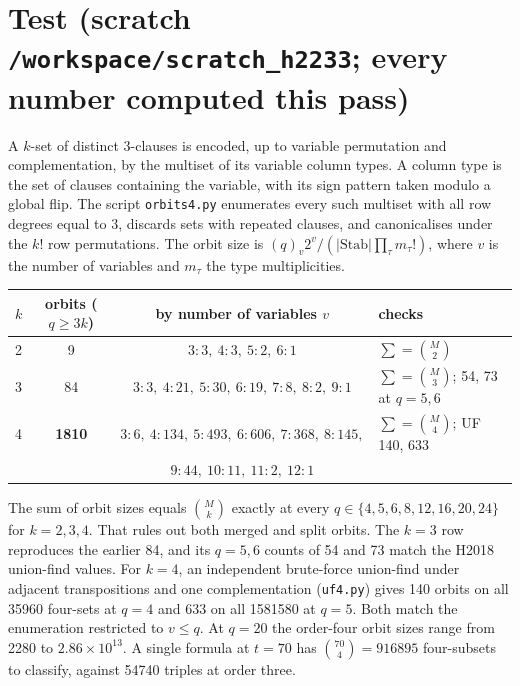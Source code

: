\documentclass[11pt]{article}
\begin{document}
\section*{Test (scratch \texttt{/workspace/scratch\_h2233}; every number computed this pass)}
A $k$-set of distinct 3-clauses is encoded, up to variable permutation and complementation, by the multiset of its variable column types. A column type is the set of clauses containing the variable, with its sign pattern taken modulo a global flip. The script \texttt{orbits4.py} enumerates every such multiset with all row degrees equal to 3, discards sets with repeated clauses, and canonicalises under the $k!$ row permutations. The orbit size is $(q)_v2^v/(|\mathrm{Stab}|\prod_\tau m_\tau!)$, where $v$ is the number of variables and $m_\tau$ the type multiplicities.

\begin{center}\begin{tabular}{lccl}\toprule
$k$ & orbits ($q\ge3k$) & by number of variables $v$ & checks\\\midrule
2 & 9 & $3{:}3,\ 4{:}3,\ 5{:}2,\ 6{:}1$ & $\sum=\binom M2$\\
3 & 84 & $3{:}3,\ 4{:}21,\ 5{:}30,\ 6{:}19,\ 7{:}8,\ 8{:}2,\ 9{:}1$ & $\sum=\binom M3$; 54, 73 at $q=5,6$\\
4 & \textbf{1810} & $3{:}6,\ 4{:}134,\ 5{:}493,\ 6{:}606,\ 7{:}368,\ 8{:}145,$ & $\sum=\binom M4$; UF 140, 633\\
 & & $9{:}44,\ 10{:}11,\ 11{:}2,\ 12{:}1$ & \\\bottomrule
\end{tabular}\end{center}

The sum of orbit sizes equals $\binom{M}{k}$ exactly at every $q\in\{4,5,6,8,12,16,20,24\}$ for $k=2,3,4$. That rules out both merged and split orbits. The $k=3$ row reproduces the earlier 84, and its $q=5,6$ counts of 54 and 73 match the H2018 union-find values. For $k=4$, an independent brute-force union-find under adjacent transpositions and one complementation (\texttt{uf4.py}) gives 140 orbits on all 35960 four-sets at $q=4$ and 633 on all 1581580 at $q=5$. Both match the enumeration restricted to $v\le q$. At $q=20$ the order-four orbit sizes range from 2280 to $2.86\times10^{13}$. A single formula at $t=70$ has $\binom{70}{4}=916895$ four-subsets to classify, against 54740 triples at order three.
\end{document}

